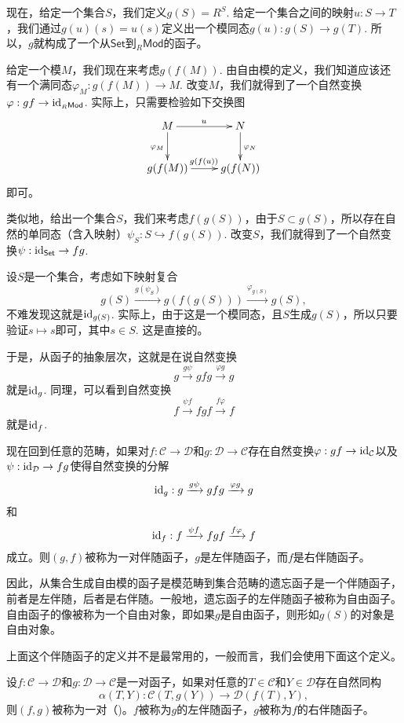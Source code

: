 \begin{para}
现在，给定一个集合$S$，我们定义$g(S)=R^S$. 给定一个集合之间的映射$u:S\to T$，我们通过$g(u)(s)=u(s)$定义出一个模同态$g(u):g(S)\to g(T)$. 所以，$g$就构成了一个从$\mathsf{Set}$到${}_R\mathsf{Mod}$的函子。

给定一个模$M$，我们现在来考虑$g(f(M))$. 由自由模的定义，我们知道应该还有一个满同态$\varphi_M:g(f(M))\to M$. 改变$M$，我们就得到了一个自然变换$\varphi:gf\to \operatorname{id}_{{}_R\mathsf{Mod}}$. 实际上，只需要检验如下交换图
\[
	\xymatrix{
	M\ar[d]_{\varphi_M}\ar[r]^u&N\ar[d]^{\varphi_N}\\
	g(f(M))\ar[r]^{g(f(u))}&g(f(N))\\
	}
\]
即可。

类似地，给出一个集合$S$，我们来考虑$f(g(S))$，由于$S\subset g(S)$，所以存在自然的单同态（含入映射）$\psi_S:S\hookrightarrow f(g(S))$. 改变$S$，我们就得到了一个自然变换$\psi:\operatorname{id}_{\mathsf{Set}}\to fg$.

设$S$是一个集合，考虑如下映射复合
\[
	g(S)\xrightarrow{g(\psi_S)}g(f(g(S)))\xrightarrow{\varphi_{g(S)}}g(S),
\]
不难发现这就是$\operatorname{id}_{g(S)}$. 实际上，由于这是一个模同态，且$S$生成$g(S)$，所以只要验证$s\mapsto s$即可，其中$s\in S$. 这是直接的。

于是，从函子的抽象层次，这就是在说自然变换
\[
	g\xrightarrow{g \psi}gfg\xrightarrow{\varphi g}g
\]
就是$\operatorname{id}_g$. 同理，可以看到自然变换
\[
	f\xrightarrow{\psi f}fgf\xrightarrow{f \varphi}f
\]
就是$\operatorname{id}_f$.
\end{para}

\begin{para}
现在回到任意的范畴，如果对$f:\mathcal{C}\to \mathcal{D}$和$g:\mathcal{D}\to \mathcal{C}$存在自然变换$\varphi:gf\to \operatorname{id}_{\mathcal{C}}$以及$\psi:\operatorname{id}_{\mathcal{D}}\to fg$使得自然变换的分解
\[
	\operatorname{id}_g:g\xrightarrow{g \psi}gfg\xrightarrow{\varphi g}g
\]
和
\[
	\operatorname{id}_f:f\xrightarrow{\psi f}fgf\xrightarrow{f \varphi}f
\]
成立。则$(g,f)$被称为一对伴随函子，$g$是左伴随函子，而$f$是右伴随函子。
\end{para}

因此，从集合生成自由模的函子是模范畴到集合范畴的遗忘函子是一个伴随函子，前者是左伴随，后者是右伴随。一般地，遗忘函子的左伴随函子被称为自由函子。自由函子的像被称为一个自由对象，即如果$g$是自由函子，则形如$g(S)$的对象是自由对象。

上面这个伴随函子的定义并不是最常用的，一般而言，我们会使用下面这个定义。

\begin{para}
设$f:\mathcal{C}\to \mathcal{D}$和$g:\mathcal{D}\to \mathcal{C}$是一对函子，如果对任意的$T\in\mathcal{C}$和$Y\in\mathcal{D}$存在自然同构
\[
	\alpha(T,Y):\mathcal{C}(T,g(Y))\to \mathcal{D}(f(T),Y),
\]
则$(f,g)$被称为一对（)。$f$被称为$g$的左伴随函子，$g$被称为$f$的右伴随函子。
\end{para}


